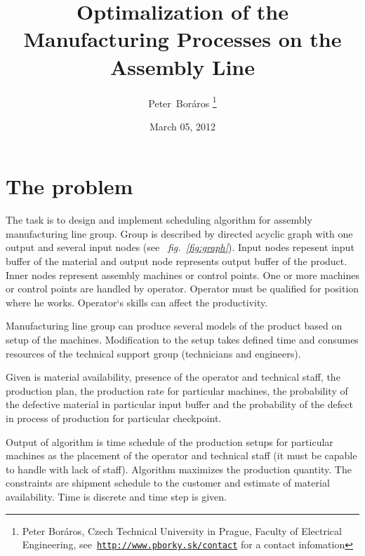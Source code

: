 \documentclass[a4paper,journal,onecolumn]{IEEEtran}
\begin{document}
\title{Optimalization of the Manufacturing Processes on the Assembly Line}
\date{March 05, 2012}
\author{Peter~Boráros %
\thanks{{Peter Boráros}, Czech Technical University in Prague, Faculty of Electrical Engineering,
see~\href{http://www.pborky.sk/contact}{\scriptsize{\texttt{http://www.pborky.sk/contact}}} for a contact infomation}}%




\maketitle
\IEEEdisplaynotcompsoctitleabstractindextext
\IEEEpeerreviewmaketitle

\section{The problem}\label{ass}
The task is to design and implement scheduling algorithm for assembly manufacturing line group.
Group is described by directed acyclic graph with one output and several input nodes (see
~\emph{fig.~\ref{fig:graph}}). Input nodes repesent input buffer of the material and output node represents
output buffer of the product. Inner nodes represent assembly machines or control points.
One or more machines or control points are handled by operator. Operator must be qualified for 
position where he works. Operator`s skills can affect the productivity.

Manufacturing line group can produce several models of the product based on setup of the 
machines. Modification to the setup takes defined time and consumes resources of the
technical support group (technicians and engineers).

Given is material availability, presence of the operator and technical staff, the production plan,
the production rate for particular machines, the probability of the defective material in 
particular input buffer and the probability of the defect in process of production for particular
checkpoint.

Output of algorithm is time schedule of the production setups for particular machines as the 
placement of the operator and technical staff (it must be capable to handle with lack of staff).
Algorithm maximizes the production quantity. The constraints are shipment schedule to
the customer and estimate of material availability. Time is discrete and time step is given.
\end{document}
